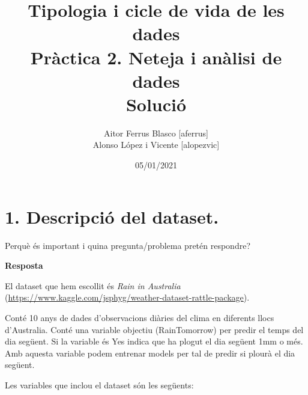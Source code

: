 \documentclass[
]{article}
\title{Tipologia i cicle de vida de les dades\\
Pràctica 2. Neteja i anàlisi de dades\\
Solució}
\author{Aitor Ferrus Blasco {[}aferrus{]}\\
Alonso López i Vicente {[}alopezvic{]}}
\date{05/01/2021}
\begin{document}
\maketitle

{
\setcounter{tocdepth}{3}
\tableofcontents
}
\newpage

\hypertarget{descripciuxf3-del-dataset.}{%
\section{1. Descripció del dataset.}\label{descripciuxf3-del-dataset.}}

Perquè és important i quina pregunta/problema pretén respondre?

\textbf{Resposta}

El dataset que hem escollit és \emph{Rain in Australia}
(\url{https://www.kaggle.com/jsphyg/weather-dataset-rattle-package}).

Conté 10 anys de dades d'observacions diàries del clima en diferents
llocs d'Australia. Conté una variable objectiu (RainTomorrow) per predir
el temps del dia següent. Si la variable és Yes indica que ha plogut el
dia següent 1mm o més. Amb aquesta variable podem entrenar models per
tal de predir si plourà el dia següent.

Les variables que inclou el dataset són les següents:
\end{document}

